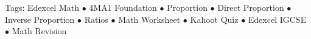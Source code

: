 \documentclass[11pt,a4paper]{article}
\begin{document}
\vspace{14pt}
\begin{center}
  \sffamily\scriptsize\textcolor{textmuted}{
    Tags: Edexcel Math $\bullet$ 4MA1 Foundation $\bullet$ Proportion $\bullet$ Direct Proportion $\bullet$ Inverse Proportion $\bullet$ Ratios $\bullet$ Math Worksheet $\bullet$ Kahoot Quiz $\bullet$ Edexcel IGCSE $\bullet$ Math Revision
  }
\end{center}
\end{document}
